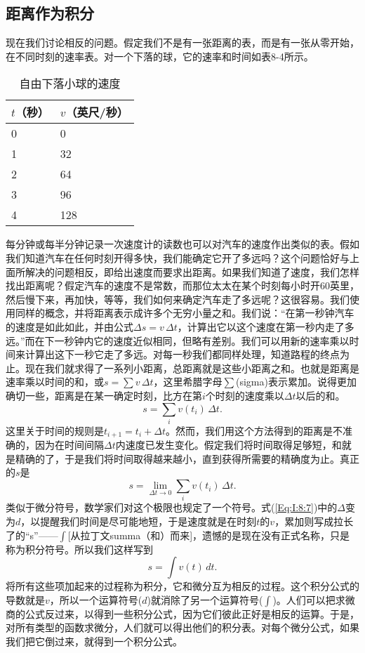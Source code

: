 \documentclass[12pt,oneside]{book}
\begin{document}
\begin{common-format}
\section{距离作为积分}
现在我们讨论相反的问题。假定我们不是有一张距离的表，而是有一张从零开始，在不同时刻的速率表。对一个下落的球，它的速率和时间如表8-4所示。
\begin{table}[H]
\centering
\caption{自由下落小球的速度}
\label{tab:8-2}
\medskip 
\begin{tabular}{@{}ll@{}}
\toprule
$t$（秒） & $v$（英尺/秒）  \\ \midrule
0  & 0  \\
1  & 32 \\
2  & 64 \\
3  & 96 \\
4  & 128 
 \\ \bottomrule
\end{tabular}
\end{table}

每分钟或每半分钟记录一次速度计的读数也可以对汽车的速度作出类似的表。假如我们知道汽车在任何时刻开得多快，我们能确定它开了多远吗？这个问题恰好与上面所解决的问题相反，即给出速度而要求出距离。如果我们知道了速度，我们怎样找出距离呢？假定汽车的速度不是常数，而那位太太在某个时刻每小时开60英里，然后慢下来，再加快，等等，我们如何来确定汽车走了多远呢？这很容易。我们使用同样的概念，并将距离表示成许多个无穷小量之和。我们说：“在第一秒钟汽车的速度是如此如此，并由公式$\Delta s=v\,\Delta t$，计算出它以这个速度在第一秒内走了多远。”而在下一秒钟内它的速度近似相同，但略有差别。我们可以用新的速率乘以时间来计算出这下一秒它走了多远。对每一秒我们都同样处理，知道路程的终点为止。现在我们就求得了一系列小距离，总距离就是这些小距离之和。也就是距离是速率乘以时间的和，或$s=\sum v\,\Delta t$，这里希腊字母$\sum$(sigma)表示累加。说得更加确切一些，距离是在某一确定时刻，比方在第$i$个时刻的速度乘以$\Delta t$以后的和。
\begin{equation}
\label{Eq:I:8:6}
s=\sum_iv(t_i)\,\Delta t.
\end{equation}
这里关于时间的规则是$t_{i+1}=t_i+\Delta t$。然而，我们用这个方法得到的距离是不准确的，因为在时间间隔$\Delta t$内速度已发生变化。假定我们将时间取得足够短，和就是精确的了，于是我们将时间取得越来越小，直到获得所需要的精确度为止。真正的$s$是
\begin{equation}
\label{Eq:I:8:7}
s=\lim_{\Delta t\to0}\sum_iv(t_i)\,\Delta t.
\end{equation}
类似于微分符号，数学家们对这个极限也规定了一个符号。式(\ref{Eq:I:8:7})中的$\Delta$变为$d$，以提醒我们时间是尽可能地短，于是速度就是在时刻$t$的$v$，累加则写成拉长了的“s”——$\int$[从拉丁文summa（和）而来]，遗憾的是现在没有正式名称，只是称为积分符号。所以我们这样写到
\begin{equation}
\label{Eq:I:8:8}
s=\int v(t)\,dt.
\end{equation}
将所有这些项加起来的过程称为积分，它和微分互为相反的过程。这个积分公式的导数就是$v$，所以一个运算符号($d$)就消除了另一个运算符号($\int$)。人们可以把求微商的公式反过来，以得到一些积分公式，因为它们彼此正好是相反的运算。于是，对所有类型的函数求微分，人们就可以得出他们的积分表。对每个微分公式，如果我们把它倒过来，就得到一个积分公式。


\end{common-format}
\end{document}
